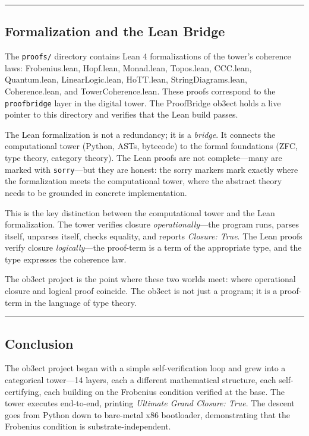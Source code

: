 \documentclass[12pt,a4paper]{article}
\begin{document}
\begin{center}
\rule{0.5\textwidth}{0.4pt}
\end{center}

\subsection{Formalization and the Lean Bridge}

The \texttt{proofs/} directory contains Lean 4 formalizations of the tower's coherence laws: Frobenius.lean, Hopf.lean, Monad.lean, Topos.lean, CCC.lean, Quantum.lean, LinearLogic.lean, HoTT.lean, StringDiagrams.lean, Coherence.lean, and TowerCoherence.lean. These proofs correspond to the \texttt{proofbridge} layer in the digital tower. The ProofBridge ob3ect holds a live pointer to this directory and verifies that the Lean build passes.

The Lean formalization is not a redundancy; it is a \emph{bridge}. It connects the computational tower (Python, ASTs, bytecode) to the formal foundations (ZFC, type theory, category theory). The Lean proofs are not complete---many are marked with \texttt{sorry}---but they are honest: the sorry markers mark exactly where the formalization meets the computational tower, where the abstract theory needs to be grounded in concrete implementation.

This is the key distinction between the computational tower and the Lean formalization. The tower verifies closure \emph{operationally}---the program runs, parses itself, unparses itself, checks equality, and reports \emph{Closure: True}. The Lean proofs verify closure \emph{logically}---the proof-term is a term of the appropriate type, and the type expresses the coherence law.

The ob3ect project is the point where these two worlds meet: where operational closure and logical proof coincide. The ob3ect is not just a program; it is a proof-term in the language of type theory.

\begin{center}
\rule{0.5\textwidth}{0.4pt}
\end{center}

\subsection{Conclusion}

The ob3ect project began with a simple self-verification loop and grew into a categorical tower---14 layers, each a different mathematical structure, each self-certifying, each building on the Frobenius condition verified at the base. The tower executes end-to-end, printing \emph{Ultimate Grand Closure: True}. The descent goes from Python down to bare-metal x86 bootloader, demonstrating that the Frobenius condition is substrate-independent.
\end{document}

